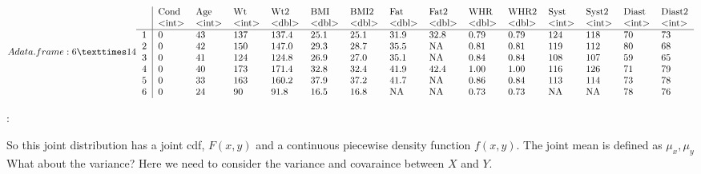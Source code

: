 \documentclass[letterpaper,10pt,english]{jupyterBook}
\begin{document}
\begin{equation*}
\begin{split}A data.frame: 6 × 14
\begin{tabular}{r|llllllllllllll}
  & Cond & Age & Wt & Wt2 & BMI & BMI2 & Fat & Fat2 & WHR & WHR2 & Syst & Syst2 & Diast & Diast2\\
  & <int> & <int> & <int> & <dbl> & <dbl> & <dbl> & <dbl> & <dbl> & <dbl> & <dbl> & <int> & <int> & <int> & <int>\\
\hline
	1 & 0 & 43 & 137 & 137.4 & 25.1 & 25.1 & 31.9 & 32.8 & 0.79 & 0.79 & 124 & 118 & 70 & 73\\
	2 & 0 & 42 & 150 & 147.0 & 29.3 & 28.7 & 35.5 &   NA & 0.81 & 0.81 & 119 & 112 & 80 & 68\\
	3 & 0 & 41 & 124 & 124.8 & 26.9 & 27.0 & 35.1 &   NA & 0.84 & 0.84 & 108 & 107 & 59 & 65\\
	4 & 0 & 40 & 173 & 171.4 & 32.8 & 32.4 & 41.9 & 42.4 & 1.00 & 1.00 & 116 & 126 & 71 & 79\\
	5 & 0 & 33 & 163 & 160.2 & 37.9 & 37.2 & 41.7 &   NA & 0.86 & 0.84 & 113 & 114 & 73 & 78\\
	6 & 0 & 24 &  90 &  91.8 & 16.5 & 16.8 &   NA &   NA & 0.73 & 0.73 &  NA &  NA & 78 & 76\\
\end{tabular}\end{split}
\end{equation*}
\begin{sphinxVerbatim}[commandchars=\\\{\}]
             
:
\end{sphinxVerbatim}

\sphinxAtStartPar
So this joint distribution has a joint cdf, \(F(x,y)\) and a continuous piecewise density function \(f(x,y)\). The joint mean is defined as \(\mu_x,\mu_y\) What about the variance? Here we need to consider the variance and covaraince between \(X\) and \(Y\).
\end{document}
